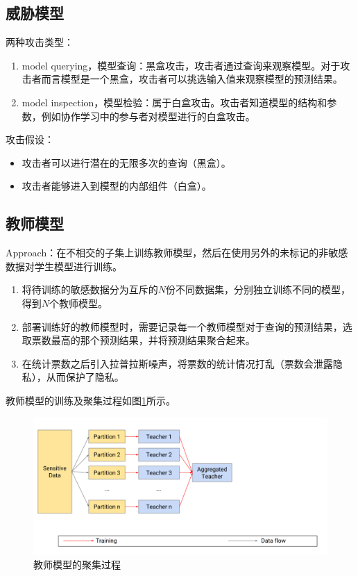 \documentclass[a4paper]{article}
\begin{document}
\subsection{威胁模型}

两种攻击类型：
\begin{enumerate}
\item model querying，模型查询：黑盒攻击，攻击者通过查询来观察模型。对于攻击者而言模型是一个黑盒，攻击者可以挑选输入值来观察模型的预测结果。
\item model inspection，模型检验：属于白盒攻击。攻击者知道模型的结构和参数，例如\cite{hitaj2017deep}\cite{hitaj2017deep}协作学习中的参与者对模型进行的白盒攻击。
\end{enumerate}
攻击假设：
\begin{itemize}
\item 攻击者可以进行潜在的无限多次的查询（黑盒）。
\item 攻击者能够进入到模型的内部组件（白盒）。
\end{itemize}


\subsection{教师模型}

Approach：在不相交的子集上训练教师模型，然后在使用另外的未标记的非敏感数据对学生模型进行训练。
\begin{enumerate}
\item 将待训练的敏感数据分为互斥的$N$份不同数据集，分别独立训练不同的模型，得到$N$个教师模型。
\item 部署训练好的教师模型时，需要记录每一个教师模型对于查询的预测结果，选取票数最高的那个预测结果，并将预测结果聚合起来。
\item 在统计票数之后引入拉普拉斯噪声，将票数的统计情况打乱（票数会泄露隐私），从而保护了隐私。
\end{enumerate}

教师模型的训练及聚集过程如图\ref*{fig:teacher-model}所示。

\begin{figure}[!ht]
\includegraphics[width = \linewidth]{fig/teacher-model.png}
\caption{教师模型的聚集过程}
\label{fig:teacher-model}
\end{figure}
\end{document}
